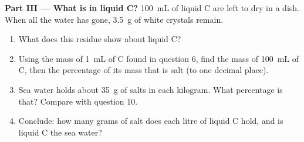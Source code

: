 \begin{problem}
\medskip
\noindent\textbf{Part III --- What is in liquid C?}
\qty{100}{mL} of liquid C are left to dry in a dish. When all the water
has gone, \qty{3.5}{g} of white crystals remain.
\begin{enumerate}[resume]
  \item What does this residue show about liquid C?
  \item Using the mass of \qty{1}{mL} of C found in question 6, find the
        mass of \qty{100}{mL} of C, then the percentage of its mass that
        is salt (to one decimal place).
  \item Sea water holds about \qty{35}{g} of salts in each kilogram. What
        percentage is that? Compare with question 10.
  \item Conclude: how many grams of salt does each litre of liquid C
        hold, and is liquid C the sea water?
\end{enumerate}
\end{problem}
